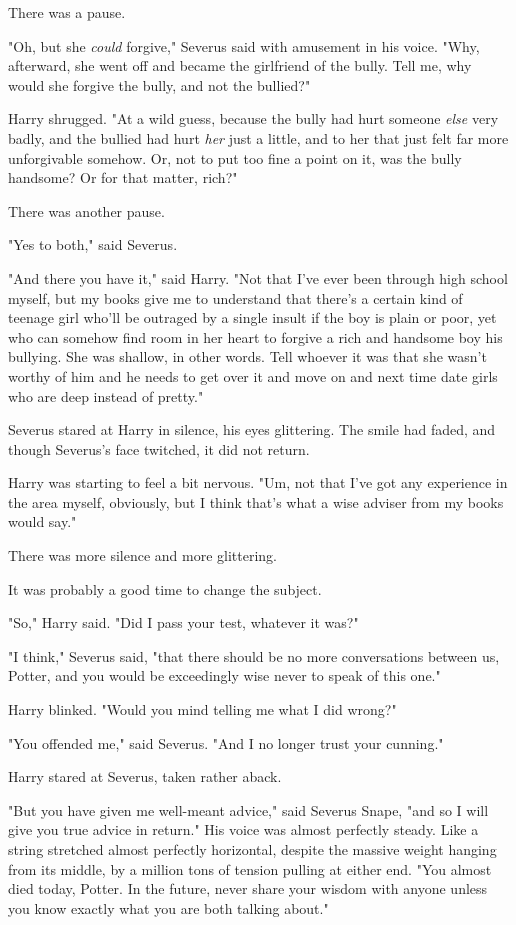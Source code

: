 There was a pause.

"Oh, but she \emph{could} forgive," Severus said with amusement in his voice. 
"Why, afterward, she went off and became the girlfriend of the bully. Tell me, 
why would she forgive the bully, and not the bullied?"

Harry shrugged. "At a wild guess, because the bully had hurt someone 
\emph{else} very badly, and the bullied had hurt \emph{her} just a little, and 
to her that just felt far more unforgivable somehow. Or, not to put too fine a 
point on it, was the bully handsome? Or for that matter, rich?"

There was another pause.

"Yes to both," said Severus.

"And there you have it," said Harry. "Not that I've ever been through high 
school myself, but my books give me to understand that there's a certain kind 
of teenage girl who'll be outraged by a single insult if the boy is plain or 
poor, yet who can somehow find room in her heart to forgive a rich and handsome 
boy his bullying. She was shallow, in other words. Tell whoever it was that she 
wasn't worthy of him and he needs to get over it and move on and next time date 
girls who are deep instead of pretty."

Severus stared at Harry in silence, his eyes glittering. The smile had faded, 
and though Severus's face twitched, it did not return.

Harry was starting to feel a bit nervous. "Um, not that I've got any experience 
in the area myself, obviously, but I think that's what a wise adviser from my 
books would say."

There was more silence and more glittering.

It was probably a good time to change the subject.

"So," Harry said. "Did I pass your test, whatever it was?"

"I think," Severus said, "that there should be no more conversations between 
us, Potter, and you would be exceedingly wise never to speak of this one."

Harry blinked. "Would you mind telling me what I did wrong?"

"You offended me," said Severus. "And I no longer trust your cunning."

Harry stared at Severus, taken rather aback.

"But you have given me well-meant advice," said Severus Snape, "and so I will 
give you true advice in return." His voice was almost perfectly steady. Like a 
string stretched almost perfectly horizontal, despite the massive weight 
hanging from its middle, by a million tons of tension pulling at either end. 
"You almost died today, Potter. In the future, never share your wisdom with 
anyone unless you know exactly what you are both talking about."

